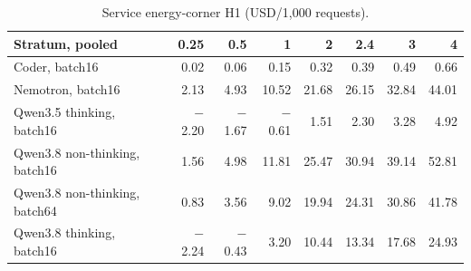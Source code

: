 
\begin{table}[t]
\caption{Service energy-corner H1 (USD/1,000 requests).}
\label{tab:service-energy}
\centering\small
\begin{tabular}{lrrrrrrr}
\toprule
Stratum, pooled & 0.25 & 0.5 & 1 & 2 & 2.4 & 3 & 4 \\
\midrule
Coder, batch16 & 0.02 & 0.06 & 0.15 & 0.32 & 0.39 & 0.49 & 0.66 \\
Nemotron, batch16 & 2.13 & 4.93 & 10.52 & 21.68 & 26.15 & 32.84 & 44.01 \\
Qwen3.5 thinking, batch16 & $-$2.20 & $-$1.67 & $-$0.61 & 1.51 & 2.30 & 3.28 & 4.92 \\
Qwen3.8 non-thinking, batch16 & 1.56 & 4.98 & 11.81 & 25.47 & 30.94 & 39.14 & 52.81 \\
Qwen3.8 non-thinking, batch64 & 0.83 & 3.56 & 9.02 & 19.94 & 24.31 & 30.86 & 41.78 \\
Qwen3.8 thinking, batch16 & $-$2.24 & $-$0.43 & 3.20 & 10.44 & 13.34 & 17.68 & 24.93 \\
\bottomrule
\end{tabular}
\end{table}
